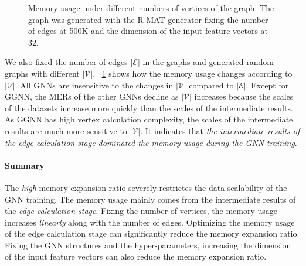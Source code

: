 \begin{figure}[tbp]
    \centering
    \caption{Memory usage under different numbers of vertices of the graph. The graph was generated with the R-MAT generator fixing the number of edges at 500K and the dimension of the input feature vectors at 32.}
    \label{fig:exp_memory_expansion_ratio_input_graph_number_of_vertices_fixed_edge}
\end{figure}

We also fixed the number of edges $|\mathcal{E}|$ in the graphs and generated random graphs with different $|\mathcal{V}|$.
\figurename~\ref{fig:exp_memory_expansion_ratio_input_graph_number_of_vertices_fixed_edge} shows how the memory usage changes according to $|\mathcal{V}|$.
All GNNs are insensitive to the changes in $|\mathcal{V}|$ compared to $|\mathcal{E}|$.
Except for GGNN, the MERs of the other GNNs decline as $|\mathcal{V}|$ increases because the scales of the datasets increase more quickly than the scales of the intermediate results.
As GGNN has high vertex calculation complexity, the scales of the intermediate results are much more sensitive to $|\mathcal{V}|$.
It indicates that \emph{the intermediate results of the edge calculation stage dominated the memory usage during the GNN training}.

\paragraph{Summary}
The \emph{high} memory expansion ratio severely restrictes the data scalability of the GNN training.
The memory usage mainly comes from the intermediate results of the \emph{edge calculation stage}.
Fixing the number of vertices, the memory usage increases \emph{linearly} along with the number of edges.
Optimizing the memory usage of the edge calculation stage can significantly reduce the memory expansion ratio.
Fixing the GNN structures and the hyper-parameters, increasing the dimension of the input feature vectors can also reduce the memory expansion ratio.

